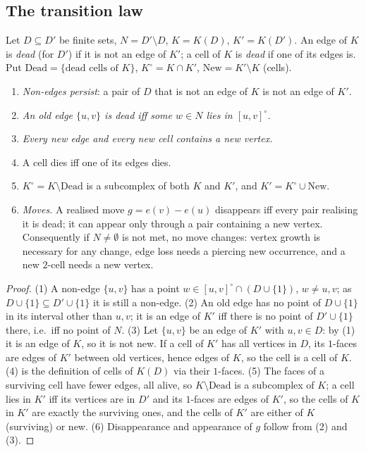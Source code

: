 \subsection{The transition law}
Let $D\subseteq D'$ be finite sets, $N=D'\setminus D$, $K=K(D)$, $K'=K(D')$. An edge of $K$ is \emph{dead} (for $D'$) if it is not an edge of $K'$; a cell of $K$ is \emph{dead} if one of its edges is. Put $\mathrm{Dead}=\{\text{dead cells of }K\}$, $K^\circ=K\cap K'$, $\mathrm{New}=K'\setminus K$ (cells).
\begin{theorem}\label{thm:A5T32}
\begin{enumerate}[label=(\arabic*),itemsep=1pt]
\item \emph{Non-edges persist}: a pair of $D$ that is not an edge of $K$ is not an edge of $K'$.
\item \emph{An old edge $\{u,v\}$ is dead iff some $w\in N$ lies in $[u,v]^\circ$.}
\item \emph{Every new edge and every new cell contains a new vertex.}
\item A cell dies iff one of its edges dies.
\item $K^\circ=K\setminus\mathrm{Dead}$ is a subcomplex of both $K$ and $K'$, and $K'=K^\circ\cup\mathrm{New}$.
\item \emph{Moves.} A realised move $g=e(v)-e(u)$ disappears iff every pair realising it is dead; it can appear only through a pair containing a new vertex. Consequently if $N\ne\emptyset$ is not met, no move changes: vertex growth is necessary for any change, edge loss needs a piercing new occurrence, and a new $2$-cell needs a new vertex.
\end{enumerate}
\end{theorem}
\begin{proof}
(1) A non-edge $\{u,v\}$ has a point $w\in[u,v]^\circ\cap(D\cup\{1\})$, $w\ne u,v$; as $D\cup\{1\}\subseteq D'\cup\{1\}$ it is still a non-edge. (2) An old edge has no point of $D\cup\{1\}$ in its interval other than $u,v$; it is an edge of $K'$ iff there is no point of $D'\cup\{1\}$ there, i.e.\ iff no point of $N$. (3) Let $\{u,v\}$ be an edge of $K'$ with $u,v\in D$: by (1) it is an edge of $K$, so it is not new. If a cell of $K'$ has all vertices in $D$, its $1$-faces are edges of $K'$ between old vertices, hence edges of $K$, so the cell is a cell of $K$. (4) is the definition of cells of $K(D)$ via their $1$-faces. (5) The faces of a surviving cell have fewer edges, all alive, so $K\setminus\mathrm{Dead}$ is a subcomplex of $K$; a cell lies in $K'$ iff its vertices are in $D'$ and its $1$-faces are edges of $K'$, so the cells of $K$ in $K'$ are exactly the surviving ones, and the cells of $K'$ are either of $K$ (surviving) or new. (6) Disappearance and appearance of $g$ follow from (2) and (3). \qedhere
\end{proof}
